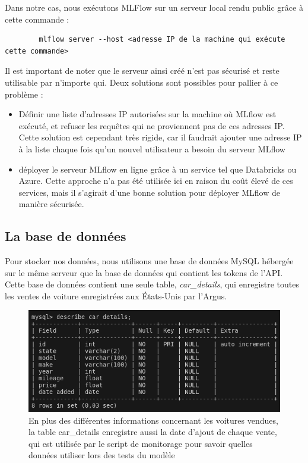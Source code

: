 \documentclass[french]{article}
\begin{document}
    Dans notre cas, nous exécutons MLFlow sur un serveur local rendu public grâce à cette commande :
    \begin{verbatim}
        mlflow server --host <adresse IP de la machine qui exécute cette commande>
    \end{verbatim}

    Il est important de noter que le serveur ainsi créé n'est pas sécurisé et reste utilisable par n'importe qui. Deux solutions sont possibles pour pallier à ce problème :
    \begin{itemize}
        \item Définir une liste d'adresses IP autorisées sur la machine où MLflow est exécuté, et refuser les requêtes qui ne proviennent pas de ces adresses IP. Cette solution est cependant très rigide, car il faudrait ajouter une adresse IP à la liste chaque fois qu'un nouvel utilisateur a besoin du serveur MLflow
        \item déployer le serveur MLflow en ligne grâce à un service tel que Databricks ou Azure. Cette approche n'a pas été utilisée ici en raison du coût élevé de ces services, mais il s'agirait d'une bonne solution pour déployer MLflow de manière sécurisée.
    \end{itemize}

    \subsection{La base de données}

    Pour stocker nos données, nous utilisons une base de données MySQL hébergée sur le même serveur que la base de données qui contient les tokens de l'API. Cette base de données contient une seule table, \textit{car\_details}, qui enregistre toutes les ventes de voiture enregistrées aux États-Unis par l'Argus.

    \begin{figure}[h!]
        \includegraphics[width=12cm]{car_details_table}
        \centering
        \caption{En plus des différentes informations concernant les voitures vendues, la table car\_details enregistre aussi la date d'ajout de chaque vente, qui est utilisée par le script de monitorage pour savoir quelles données utiliser lors des tests du modèle}
    \end{figure}
\end{document}
